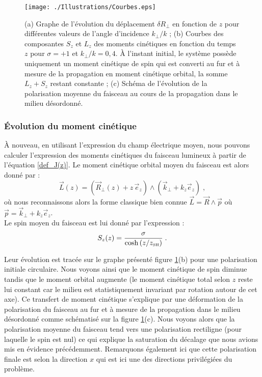 \documentclass[a4paper,11pt]{article} %
\begin{document}
	
	\begin{figure}[h]
		\centering
		\begin{minipage}[c]{0.85\linewidth}
			\centering
			\texttt{[image: ./Illustrations/Courbes.eps]}
			\caption{(a) Graphe de l'évolution du déplacement $ \delta R_\perp $ en fonction de $ z $ pour différentes valeurs de l'angle d'incidence $k_\perp/k $ ; (b) Courbes des composantes $ S_z $ et $ L_z $ des moments cinétiques en fonction du temps $ z $ pour $ \sigma = + 1 $ et $ k_\perp / k = 0,4 $. \`{A} l'instant initial, le système possède uniquement un moment cinétique de spin qui est converti au fur et à mesure de la propagation en moment cinétique orbital, la somme $ L_z + S_z $ restant constante ; (c) Schéma de l'évolution de la polarisation moyenne du faisceau au cours de la propagation dans le milieu désordonné.}
			\label{fig:Plot}
		\end{minipage}
	\end{figure}
	
	\subsubsection{\'Evolution du moment cinétique}
	\`A nouveau, en utilisant l'expression du champ électrique moyen, nous pouvons calculer l'expression des moments cinétiques du faisceau lumineux à partir de l'équation \eqref{def_J(z)}. Le moment cinétique orbital moyen du faisceau est alors donné par :
	\begin{equation*}
		\label{exp_L(z)}
		\vec{L}(z) = \left(\vec{R}_\perp(z) + z \, \vec{e}_z \right) \wedge \left( \vec{k}_\perp + k_z \vec{e}_z \right) \; ,
	\end{equation*}
	où nous reconnaissons alors la forme classique bien connue $ \vec{L} = \vec{R} \wedge \vec{p} $ où $ \vec{p} = \vec{k}_\perp + k_z \vec{e}_z $.\\
	
	Le spin moyen du faisceau est lui donné par l'expression :
	\begin{equation}
		\label{exp_S(z)}
		S_z(z) =  \frac{ \sigma}{ \cosh \left( z/z_\text{{\tiny SH}} \right) } \; .
	\end{equation}
	
	Leur évolution est tracée sur le graphe présenté figure \ref{fig:Plot}(b) pour une polarisation initiale circulaire. Nous voyons ainsi que le moment cinétique de spin diminue tandis que le moment orbital augmente (le moment cinétique total selon $ z $ reste lui constant car le milieu est statistiquement invariant par rotation autour de cet axe). Ce transfert de moment cinétique s'explique par une déformation de la polarisation du faisceau au fur et à mesure de la propagation dans le milieu désordonné comme schématisé sur la figure \ref{fig:Plot}(c). Nous voyons alors que la polarisation moyenne du faisceau tend vers une polarisation rectiligne (pour laquelle le spin est nul) ce qui explique la saturation du décalage que nous avions mis en évidence précédemment. Remarquons également ici que cette polarisation finale est selon la direction $x$ qui est ici une des directions privilégiées du problème.
	
\end{document}
